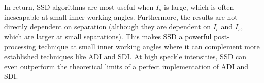 \documentclass[../main.tex]{subfiles}
\begin{document}
In return, SSD algorithms are most useful when $I_s$ is large, which is often inescapable at small inner working angles. Furthermore, the results are not directly dependent on separation (although they are dependent on $I_c$ and $I_s$, which are larger at small separations). This makes SSD a powerful post-processing technique at small inner working angles where it can complement more established techniques like ADI and SDI. At high speckle intensities, SSD can even outperform the theoretical limits of a perfect implementation of ADI and SDI.
\end{document}
